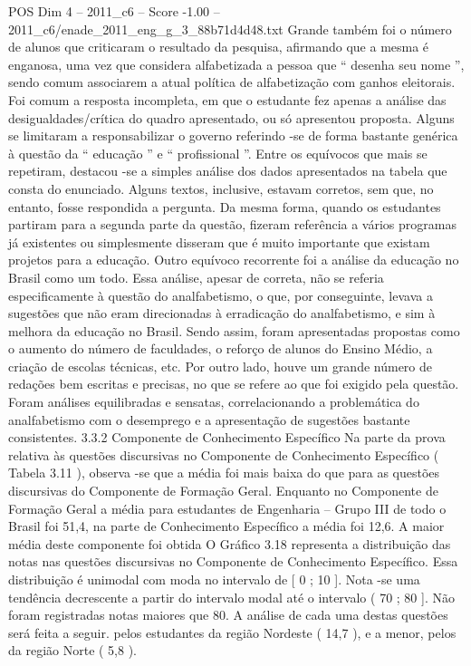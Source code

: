 \begin{textsample}{POS Dim 4 – 2011\_c6 – Score -1.00 – 2011\_c6/enade\_2011\_eng\_g\_3\_88b71d4d48.txt}
Grande também foi o número de alunos que criticaram o resultado da pesquisa, afirmando que a mesma é enganosa, uma vez que considera alfabetizada a pessoa que “ desenha seu nome ”, sendo comum associarem a atual política de alfabetização com ganhos eleitorais.
Foi comum a resposta incompleta, em que o estudante fez apenas a análise das desigualdades/crítica do quadro apresentado, ou só apresentou proposta.
Alguns se limitaram a responsabilizar o governo referindo -se de forma bastante genérica à questão da “ educação ” e “ profissional ”.
Entre os equívocos que mais se repetiram, destacou -se a simples análise dos dados apresentados na tabela que consta do enunciado.
Alguns textos, inclusive, estavam corretos, sem que, no entanto, fosse respondida a pergunta.
Da mesma forma, quando os estudantes partiram para a segunda parte da questão, fizeram referência a vários programas já existentes ou simplesmente disseram que é muito importante que existam projetos para a educação.
Outro equívoco recorrente foi a análise da educação no Brasil como um todo.
Essa análise, apesar de correta, não se referia especificamente à questão do analfabetismo, o que, por conseguinte, levava a sugestões que não eram direcionadas à erradicação do analfabetismo, e sim à melhora da educação no Brasil.
Sendo assim, foram apresentadas propostas como o aumento do número de faculdades, o reforço de alunos do Ensino Médio, a criação de escolas técnicas, etc.
Por outro lado, houve um grande número de redações bem escritas e precisas, no que se refere ao que foi exigido pela questão.
Foram análises equilibradas e sensatas, correlacionando a problemática do analfabetismo com o desemprego e a apresentação de sugestões bastante consistentes. 3.3.2 Componente de Conhecimento Específico Na parte da prova relativa às questões discursivas no Componente de Conhecimento Específico ( Tabela 3.11 ), observa -se que a média foi mais baixa do que para as questões discursivas do Componente de Formação Geral.
Enquanto no Componente de Formação Geral a média para estudantes de Engenharia – Grupo III de todo o Brasil foi 51,4, na parte de Conhecimento Específico a média foi 12,6.
A maior média deste componente foi obtida O Gráfico 3.18 representa a distribuição das notas nas questões discursivas no Componente de Conhecimento Específico.
Essa distribuição é unimodal com moda no intervalo de [ 0 ; 10 ].
Nota -se uma tendência decrescente a partir do intervalo modal até o intervalo ( 70 ; 80 ].
Não foram registradas notas maiores que 80.
A análise de cada uma destas questões será feita a seguir. pelos estudantes da região Nordeste ( 14,7 ), e a menor, pelos da região Norte ( 5,8 ).

\end{textsample}
